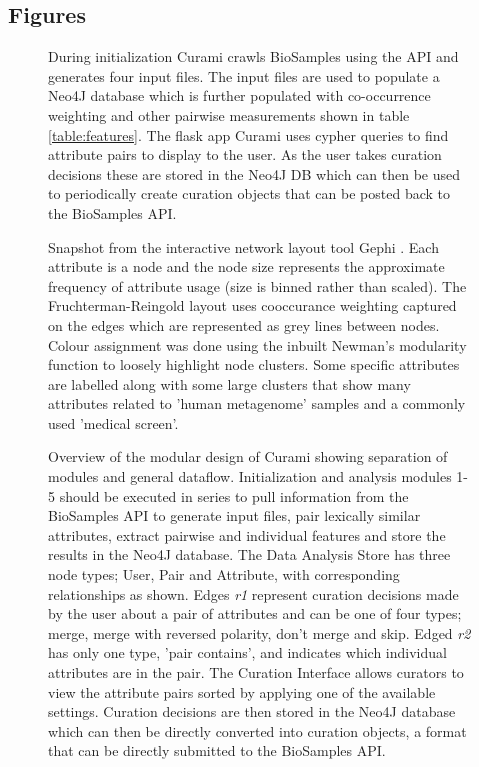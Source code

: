 \documentclass{bmcart}
\begin{document}
\begin{backmatter}

\section*{Figures}

  \begin{figure}[h!]
  \caption{
      During initialization Curami crawls BioSamples using the API and generates four input files. The input files are used to populate a Neo4J database which is further populated with co-occurrence weighting and other pairwise measurements shown in table \ref{table:features}. The flask app Curami uses cypher queries to find attribute pairs to display to the user. As the user takes curation decisions these are stored in the Neo4J DB which can then be used to periodically create curation objects that can be posted back to the BioSamples API.
      }
\label{fig:dataflow}
\end{figure}

  \begin{figure}[h!]
  \caption{ 
  Snapshot from the interactive network layout tool Gephi \cite{bastian2009gephi}. Each attribute is a node and the node size represents the approximate frequency of attribute usage (size is binned rather than scaled). The Fruchterman-Reingold layout \cite{fruchterman1991graph} uses cooccurance weighting captured on the edges which are represented as grey lines between nodes. Colour assignment was done using the inbuilt Newman's modularity function \cite{newman2006modularity} to loosely highlight node clusters. Some specific attributes  are labelled along with some large clusters that show many attributes related to 'human metagenome' samples and a commonly used 'medical screen'.
  }
\label{fig:gephi}
\end{figure}

  \begin{figure}[h!]
  \caption{
      Overview of the modular design of Curami showing separation of modules and general dataflow. Initialization and analysis modules 1-5 should be executed in series to pull information from the BioSamples API to generate input files, pair lexically similar attributes, extract pairwise and individual features and store the results in the Neo4J database. The Data Analysis Store has three node types; User, Pair and Attribute, with corresponding relationships as shown. Edges \textit{r1} represent curation decisions made by the user about a pair of attributes and can be one of four types; merge, merge with reversed polarity, don't merge and skip. Edged \textit{r2} has only one type, 'pair contains', and indicates which individual attributes are in the pair. The Curation Interface allows curators to view the attribute pairs sorted by applying one of the available settings. Curation decisions are then stored in the Neo4J database which can then be directly converted into curation objects, a format that can be directly submitted to the BioSamples API.}
\label{fig:pairing}
\end{figure}


\end{backmatter}
\end{document}
